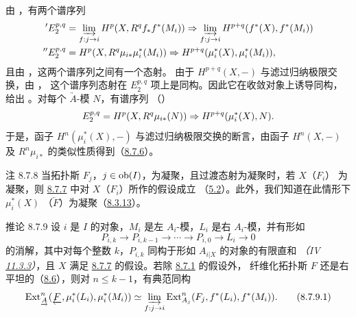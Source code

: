 \noindent
由 ，有两个谱序列
\begin{align*}
'E_{2}^{p, q} &= \varinjlim_{f:j\to i} H^p(X, R^q f_{\ast}
f^{\ast} (M_i)) \Rightarrow \varinjlim_{f:j\to i}
H^{p+q}(f^{\ast} (X), f^{\ast} (M_i))\\
''E_{2}^{p, q} &=  H^p(X, R^q \mu_{i\ast} \mu^{\ast}_i (M_i))
\Rightarrow H^{p+q} (\mu^{\ast}_i (X), \mu^{\ast}_i (M_i)){\quoi},
\end{align*}
且由 ，这两个谱序列之间有一个态射。
由于 $H^{p+q}(X,-)$ 与滤过归纳极限交换，由 ，
这个谱序列态射在 $E_2^{p,q}$ 项上是同构。因此它在收敛对象上诱导同构，给出
。对每个 $\underrightarrow{A}$-模 $N$，有谱序列
（）
$$
E^{p, q}_2 = H^{p} (X, R^q \mu_{i\ast} (N)) \Rightarrow H^{p+q}
(\mu^{\ast}_i (X), N){}.
$$
于是，函子 $H^n(\mu_i^{\ast}(X),-)$ 与滤过归纳极限交换的断言，由函子
$H^n(X,-)$ 及 $R^n\mu_{i\ast}$ 的类似性质得到（\hyperref[VI.cor8.7.6]{8.7.6}）。

\begin{enonce*}[remark]{注 8.7.8}
当拓扑斯 $F_j$，$j\in\operatorname{ob}(I)$，为凝聚，且过渡态射为凝聚时，若 $X$（\resp $F_i$）
为凝聚，则 \hyperref[VI.cor8.7.7]{8.7.7} 中对 $X$（\resp $F_i$）所作的假设成立
（\hyperref[VI.cor5.2]{5.2}）。此外，我们知道在此情形下 $\mu_i^{\ast}(X)$
（\resp $\underleftarrow{F}$）为凝聚（\hyperref[VI.thm8.3.13]{8.3.13}）。
\end{enonce*}

\begin{enonce*}{推论 8.7.9}
设\pageoriginale{} $i$ 是 $I$ 的对象，$M_i$ 是左 $A_i$-模，$L_i$ 是右 $A_i$-模，并有形如
$$
P_{i, k} \to P_{i, k-1} \to \cdots \to P_{i, 0} \to L_i \to 0
$$
的消解，其中对每个整数 $k$，$P_{i,k}$ 同构于形如 $A_{i|X}$ 的对象的有限直和
\emph{（IV \hyperref[IV.prop11.3.3]{11.3.3}）}，且 $X$ 满足
\hyperref[VI.cor8.7.7]{8.7.7} 的假设。若除 \hyperref[VI.subsubsec8.7.1]{8.7.1} 的假设外，
纤维化拓扑斯 $F$ 还是右平坦的（\hyperref[VI.subsec8.6]{8.6}），则对 $n\leq k-1$，有典范同构
\begin{equation*}
\Ext^n_{\underrightarrow{A}}(\underleftarrow{F}, \mu^{\ast}_i(L_i),
\mu^{\ast}_i (M_i)) \simeq \varinjlim_{f : j \to i}
\Ext^{n}_{A_j} (F_j, f^{\ast}(L_i), f^{\ast} (M_i)){\quoi}.\tag{8.7.9.1}
\end{equation*}
\end{enonce*}

